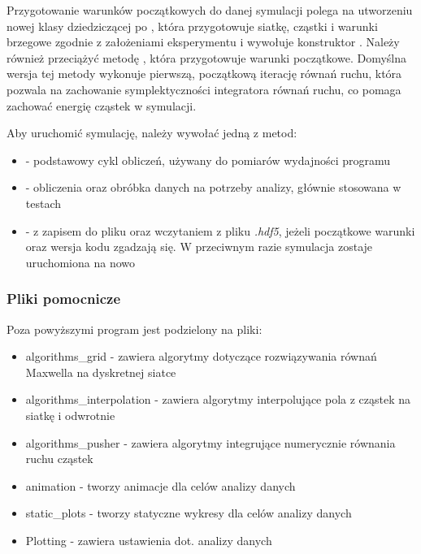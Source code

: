 {    Przygotowanie warunków początkowych do danej symulacji polega na utworzeniu nowej klasy dziedziczącej
    po , która przygotowuje siatkę, cząstki i warunki brzegowe zgodnie z założeniami
    eksperymentu i wywołuje konstruktor . Należy również przeciążyć metodę ,
    która przygotowuje warunki początkowe. Domyślna wersja tej metody wykonuje pierwszą, początkową iterację równań ruchu,
    która pozwala na zachowanie symplektyczności integratora równań ruchu, 
    co pomaga zachować energię cząstek w symulacji.

    Aby uruchomić symulację, należy wywołać jedną z metod:
    \begin{itemize}
         \item {} - podstawowy cykl obliczeń, używany do pomiarów wydajności programu
         \item {} - obliczenia oraz obróbka danych na potrzeby analizy, głównie stosowana w testach
         \item {} -  z zapisem do pliku oraz wczytaniem z pliku \emph{.hdf5},
             jeżeli początkowe
             warunki oraz wersja kodu zgadzają się. W przeciwnym razie symulacja zostaje uruchomiona na nowo
    \end{itemize}

   

    \subsubsection{Pliki pomocnicze}
    Poza powyższymi program jest podzielony na pliki: 
    \begin{itemize}
        \item algorithms\_grid - zawiera algorytmy dotyczące rozwiązywania równań Maxwella na dyskretnej siatce
        \item algorithms\_interpolation - zawiera algorytmy interpolujące pola z cząstek na siatkę i odwrotnie
        \item algorithms\_pusher - zawiera algorytmy integrujące numerycznie równania ruchu cząstek
        \item animation - tworzy animacje dla celów analizy danych
        \item static\_plots - tworzy statyczne wykresy dla celów analizy danych
        \item Plotting - zawiera ustawienia dot. analizy danych 
    \end{itemize}

}
